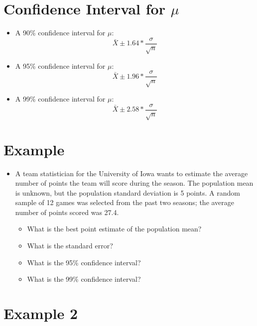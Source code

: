 \documentclass[12pt]{article}
\begin{document}
\section{\texorpdfstring{Confidence Interval for
\(\mu\)}{Confidence Interval for \textbackslash{}mu}}\label{confidence-interval-for-mu}

\begin{itemize}
\itemsep1pt\parskip0pt
\item
  A 90\% confidence interval for
  \(\mu\):\\\[ \bar{X} \pm 1.64 * \frac{\sigma}{\sqrt{n}} \]
\item
  A 95\% confidence interval for
  \(\mu\):\\\[ \bar{X} \pm 1.96 * \frac{\sigma}{\sqrt{n}} \]
\item
  A 99\% confidence interval for
  \(\mu\):\\\[ \bar{X} \pm 2.58 * \frac{\sigma}{\sqrt{n}} \]
\end{itemize}

\section{Example}\label{example}

\begin{itemize}
\itemsep1pt\parskip0pt
\item
  A team statistician for the University of Iowa wants to estimate the
  average number of points the team will score during the season. The
  population mean is unknown, but the population standard deviation is 5
  points. A random sample of 12 games was selected from the past two
  seasons; the average number of points scored was 27.4.

  \begin{itemize}
  \itemsep1pt\parskip0pt
  \item
    What is the best point estimate of the population mean?\\
  \item
    What is the standard error?
  \item
    What is the 95\% confidence interval?
  \item
    What is the 99\% confidence interval?
  \end{itemize}
\end{itemize}

\section{Example 2}\label{example-2}
\end{document}
